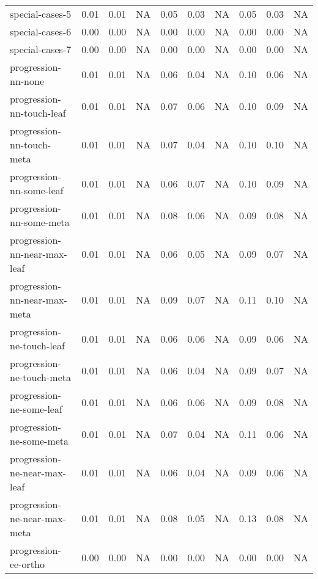 \begin{tabular}{l|rrr|rrr|rrr}
                special-cases-5 &   0.01 &  0.01 &       NA &   0.05 &   0.03 &       NA &     0.05 &    0.03 &    NA \\
                special-cases-6 &   0.00 &  0.00 &       NA &   0.00 &   0.00 &       NA &     0.00 &    0.00 &    NA \\
                special-cases-7 &   0.00 &  0.00 &       NA &   0.00 &   0.00 &       NA &     0.00 &    0.00 &    NA \\
            progression-nn-none &   0.01 &  0.01 &       NA &   0.06 &   0.04 &       NA &     0.10 &    0.06 &    NA \\
      progression-nn-touch-leaf &   0.01 &  0.01 &       NA &   0.07 &   0.06 &       NA &     0.10 &    0.09 &    NA \\
      progression-nn-touch-meta &   0.01 &  0.01 &       NA &   0.07 &   0.04 &       NA &     0.10 &    0.10 &    NA \\
       progression-nn-some-leaf &   0.01 &  0.01 &       NA &   0.06 &   0.07 &       NA &     0.10 &    0.09 &    NA \\
       progression-nn-some-meta &   0.01 &  0.01 &       NA &   0.08 &   0.06 &       NA &     0.09 &    0.08 &    NA \\
   progression-nn-near-max-leaf &   0.01 &  0.01 &       NA &   0.06 &   0.05 &       NA &     0.09 &    0.07 &    NA \\
   progression-nn-near-max-meta &   0.01 &  0.01 &       NA &   0.09 &   0.07 &       NA &     0.11 &    0.10 &    NA \\
      progression-ne-touch-leaf &   0.01 &  0.01 &       NA &   0.06 &   0.06 &       NA &     0.09 &    0.06 &    NA \\
      progression-ne-touch-meta &   0.01 &  0.01 &       NA &   0.06 &   0.04 &       NA &     0.09 &    0.07 &    NA \\
       progression-ne-some-leaf &   0.01 &  0.01 &       NA &   0.06 &   0.06 &       NA &     0.09 &    0.08 &    NA \\
       progression-ne-some-meta &   0.01 &  0.01 &       NA &   0.07 &   0.04 &       NA &     0.11 &    0.06 &    NA \\
   progression-ne-near-max-leaf &   0.01 &  0.01 &       NA &   0.06 &   0.04 &       NA &     0.09 &    0.06 &    NA \\
   progression-ne-near-max-meta &   0.01 &  0.01 &       NA &   0.08 &   0.05 &       NA &     0.13 &    0.08 &    NA \\
           progression-ee-ortho &   0.00 &  0.00 &       NA &   0.00 &   0.00 &       NA &     0.00 &    0.00 &    NA \\

\end{tabular}
